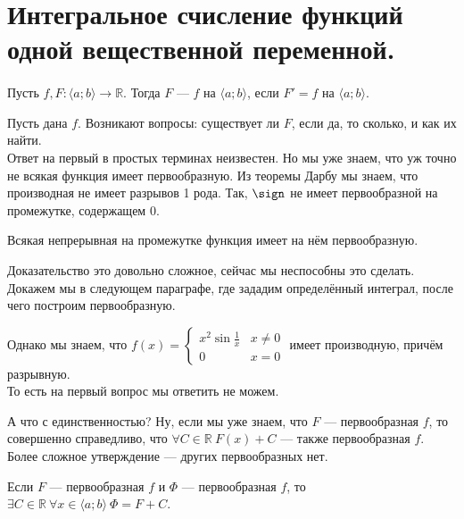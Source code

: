 \documentclass{article}
\begin{document}
    \section{Интегральное счисление функций одной вещественной переменной.}
    \paragraph{}
    \begin{itemize}
        \dfn Пусть $f,F\colon\langle a;b\rangle\to\mathbb R$. Тогда $F$ ---  $f$ на $\langle a;b\rangle$, если $F'=f$ на $\langle a;b\rangle$.
        \begin{Comment}
            Пусть дана $f$. Возникают вопросы: существует ли $F$, если да, то сколько, и как их найти.\\
            Ответ на первый в простых терминах неизвестен. Но мы уже знаем, что уж точно не всякая функция имеет первообразную. Из теоремы Дарбу мы знаем, что производная не имеет разрывов 1 рода. Так, $\sign$ не имеет первообразной на промежутке, содержащем $0$.
        \end{Comment}
        \thm Всякая непрерывная на промежутке функция имеет на нём первообразную.
        \begin{Comment}
            Доказательство это довольно сложное, сейчас мы неспособны это сделать. Докажем мы в следующем параграфе, где зададим определённый интеграл, после чего построим первообразную.
        \end{Comment}
        \begin{Comment}
            Однако мы знаем, что $f(x)=\begin{cases}
                x^2\sin\frac1x & x\neq0\\0 & x=0
            \end{cases}$ имеет производную, причём разрывную.\\
            То есть на первый вопрос мы ответить не можем.
        \end{Comment}
        \begin{Comment}
            А что с единственностью? Ну, если мы уже знаем, что $F$ --- первообразная $f$, то совершенно справедливо, что $\forall C\in\mathbb R~F(x)+C$ --- также первообразная $f$. Более сложное утверждение --- других первообразных нет.
        \end{Comment}
        \thm Если $F$ --- первообразная $f$ и $\Phi$ --- первообразная $f$, то $\exists C\in\mathbb R~\forall x\in\langle a;b\rangle~\Phi=F+C$.

\end{itemize}
\end{document}
